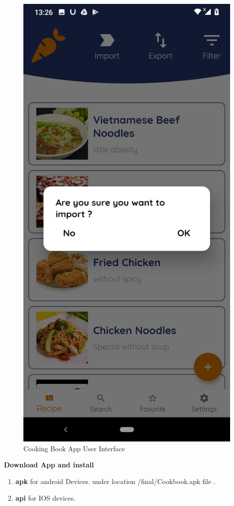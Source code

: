 \documentclass{article}
\begin{document}
\begin{figure}[h!]
    \includegraphics[scale=0.1]{Images/Import_annouce.jpg}
    \caption{Cooking Book App User Interface}
    \label{fig:cookingbook}
\end{figure}
\textbf{Download App and install}  \\
\begin{enumerate}
        \item \textbf{apk} for android Devices. under location /final/Cookbook.apk file .
        \item \textbf{api} for IOS devices.
\end{enumerate}
\end{document}
